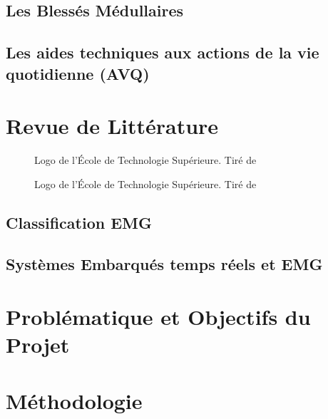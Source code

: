 \documentclass[letterpaper, twoside, 12pt, memoire, creativecommons, hyperref]{thETS}
\begin{document}
\section{Les Blessés Médullaires}

\section{Les aides techniques aux actions de la vie quotidienne (AVQ)}

\chapter{Revue de Littérature}

\begin{figure}[ht]
	\centering
	\caption{Logo de l'École de Technologie Supérieure. \newline Tiré de \cite{ETS2010}}
\end{figure}

\begin{figure}[ht]
	\centering
	\caption{Logo de l'École de Technologie Supérieure. \newline Tiré de \cite{ETS2010}}
\end{figure}

\section{Classification EMG}

\section{Systèmes Embarqués temps réels et EMG}


\chapter{Problématique et Objectifs du Projet}

\chapter{Méthodologie}
\end{document}
